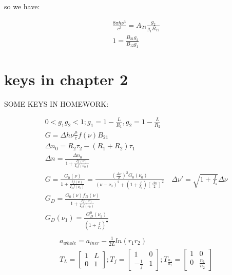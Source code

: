 \documentclass{article}
\begin{document}
so we have:

\begin{align}
&\frac{8\pi h\nu^3}{c^3}=A_{21}\frac{g_2}{g_1B_{12}}\\
&1=\frac{B_{21}g_2}{B_{12}g_1}
\end{align}
\section{keys in chapter 2}
SOME KEYS IN HOMEWORK:

\begin{align*}
  &0<g_1g_2<1;g_1=1-\frac{L}{R_1},g_2=1-\frac{L}{R_2}\\
&G=\Delta h\nu\frac{\mu}{c}f(\nu)B_{21}\\
&\Delta n_0=R_2\tau_2-(R_1+R_2)\tau_1\\
&\Delta n=\frac{\Delta n_0}{1+\frac{If(\nu)}{I_sf(\nu_0)}}\\
&G=\frac{G_0(\nu)}{1+\frac{If(\nu)}{I_sf(\nu_0)}}=\frac{(\frac{\Delta\nu}2)^2G_0(\nu_0)}{(\nu-\nu_0)^2+(1+\frac{I}{I_s})(\frac{\Delta\nu}2)^2}\quad\Delta\nu'=\sqrt{1+\frac{I}{I_s}}\Delta\nu\\
&G_D=\frac{G_0(\nu)f_D(\nu)}{1+\frac{If(\nu)}{I_sf(\nu_0)}}\\
&G_D(\nu_1)=\frac{G_D^0(\nu_1)}{(1+\frac{I}{I_s})^{\frac12}}\\
\end{align*}
\begin{align*}
&a_{whole}=a_{iner}-\frac1{2L}ln(r_1r_2)\\
&T_L=\begin{bmatrix}1&L\\0&1\end{bmatrix};T_f=\begin{bmatrix}1&0\\-\frac{1}{f}&1\end{bmatrix};T_{\frac{n_1}{n_2}}=\begin{bmatrix}1&0\\0&\frac{n_1}{n_2}\end{bmatrix}\\
\end{align*}
\end{document}
